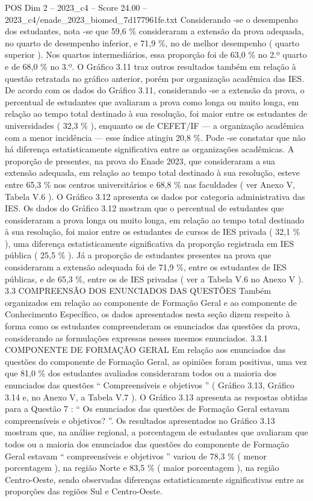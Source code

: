 \begin{textsample}{POS Dim 2 – 2023\_c4 – Score 24.00 – 2023\_c4/enade\_2023\_biomed\_7d177961fe.txt}
Considerando -se o desempenho dos estudantes, nota -se que 59,6 \% consideraram a extensão da prova adequada, no quarto de desempenho inferior, e 71,9 \%, no de melhor desempenho ( quarto superior ).
Nos quartos intermediários, essa proporção foi de 63,0 \% no 2.º quarto e de 68,0 \% no 3.º.
O Gráfico 3.11 traz outros resultados também em relação à questão retratada no gráfico anterior, porém por organização acadêmica das IES.
De acordo com os dados do Gráfico 3.11, considerando -se a extensão da prova, o percentual de estudantes que avaliaram a prova como longa ou muito longa, em relação ao tempo total destinado à sua resolução, foi maior entre os estudantes de universidades ( 32,3 \% ), enquanto os de CEFET/IF — a organização acadêmica com a menor incidência — esse índice atingiu 20,8 \%.
Pode -se constatar que não há diferença estatisticamente significativa entre as organizações acadêmicas.
A proporção de presentes, na prova do Enade 2023, que consideraram a sua extensão adequada, em relação ao tempo total destinado à sua resolução, esteve entre 65,3 \% nos centros universitários e 68,8 \% nas faculdades ( ver Anexo V, Tabela V.6 ).
O Gráfico 3.12 apresenta os dados por categoria administrativa das IES.
Os dados do Gráfico 3.12 mostram que o percentual de estudantes que consideraram a prova longa ou muito longa, em relação ao tempo total destinado à sua resolução, foi maior entre os estudantes de cursos de IES privada ( 32,1 \% ), uma diferença estatisticamente significativa da proporção registrada em IES pública ( 25,5 \% ).
Já a proporção de estudantes presentes na prova que consideraram a extensão adequada foi de 71,9 \%, entre os estudantes de IES públicas, e de 65,3 \%, entre os de IES privadas ( ver a Tabela V.6 no Anexo V ). 3.3 COMPREENSÃO DOS ENUNCIADOS DAS QUESTÕES Também organizados em relação ao componente de Formação Geral e ao componente de Conhecimento Específico, os dados apresentados nesta seção dizem respeito à forma como os estudantes compreenderam os enunciados das questões da prova, considerando as formulações expressas nesses mesmos enunciados. 3.3.1 COMPONENTE DE FORMAÇÃO GERAL Em relação aos enunciados das questões do componente de Formação Geral, as opiniões foram positivas, uma vez que 81,0 \% dos estudantes avaliados consideraram todos ou a maioria dos enunciados das questões “ Compreensíveis e objetivos ” ( Gráfico 3.13, Gráfico 3.14 e, no Anexo V, a Tabela V.7 ).
O Gráfico 3.13 apresenta as respostas obtidas para a Questão 7 : “ Os enunciados das questões de Formação Geral estavam compreensíveis e objetivos? ”.
Os resultados apresentados no Gráfico 3.13 mostram que, na análise regional, a porcentagem de estudantes que avaliaram que todos ou a maioria dos enunciados das questões do componente de Formação Geral estavam “ compreensíveis e objetivos ” variou de 78,3 \% ( menor porcentagem ), na região Norte e 83,5 \% ( maior porcentagem ), na região Centro-Oeste, sendo observadas diferenças estatisticamente significativas entre as proporções das regiões Sul e Centro-Oeste.

\end{textsample}
